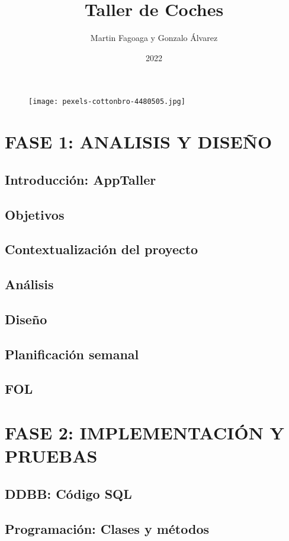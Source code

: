 \documentclass{article}
\title{Taller de Coches}
\author{Martin Fagoaga y Gonzalo Álvarez}
\date{2022}
\begin{document}
\maketitle 
\begin{figure}[H]
  \centering
  \texttt{[image: pexels-cottonbro-4480505.jpg]}
\end{figure}
\clearpage
\tableofcontents
\clearpage
\listoffigures
\clearpage
\clearpage
\lstlistoflistings
\clearpage
\section{FASE 1: ANALISIS Y DISEÑO}
\subsection{Introducción: AppTaller}
\subsection{Objetivos}
\subsection{Contextualización del proyecto}
\subsection{Análisis}
\subsection{Diseño} 
\subsection{Planificación semanal}
\subsection{FOL}
\section{FASE 2: IMPLEMENTACIÓN Y PRUEBAS}
\subsection{DDBB: Código SQL}

\subsection{Programación: Clases y métodos}
\end{document}
